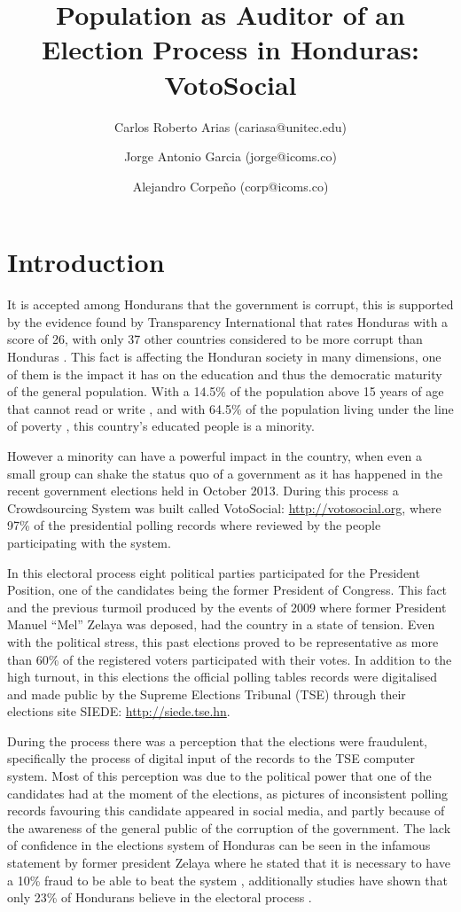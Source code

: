 \documentclass[letterpaper,10pt]{article}
\title{Population as Auditor of an Election Process in Honduras: VotoSocial}
\author[1,2]{Carlos Roberto Arias (cariasa@unitec.edu)}
\author[1,3]{Jorge Antonio Garcia (jorge@icoms.co)}
\author[3]{Alejandro Corpeño (corp@icoms.co)}
\affil[1]{Facultad de Ingenier\'{i}a, UNITEC, Tegucigalpa, Honduras}
\affil[2]{Instituto de Investigaci\'{o}n de Pol\'{i}ticas P\'{u}blicas, UNITEC, Tegucigalpa, Honduras}
\affil[3]{Icoms Technologies S de RL, Tegucigalpa, Honduras}
\begin{document}
\maketitle

\begin{abstract}

\end{abstract}

\section{Introduction}
It is accepted among Hondurans that the government is corrupt, this is supported by the evidence found by Transparency International that rates Honduras with a score of 26, with only 37 other countries considered to be more corrupt than Honduras \citep{transp}. This fact is affecting the Honduran society in many dimensions, one of them is the impact it has on the education and thus the democratic maturity of the general population. With a 14.5\% of the population above 15 years of age that cannot read or write \citep{bchrep}, and with 64.5\% of the population living under the line of poverty \citep{wbdata}, this country's educated people is a minority.


However a minority can have a powerful impact in the country, when even a small group can shake the status quo of a government \citep{saadia2014} as it has happened in the recent government elections held in October 2013. During this process a Crowdsourcing System was built called VotoSocial: \url{http://votosocial.org}, where 97\% of the presidential polling records where reviewed by the people participating with the system.

In this electoral process eight political parties participated for the President Position, one of the candidates being the former President of Congress. This fact and the previous turmoil produced by the events of 2009 where former President Manuel “Mel” Zelaya was deposed, had the country in a state of tension. Even with the political stress, this past elections proved to be representative as more than 60\% of the registered voters participated with their votes. In addition to the high turnout, in this elections the official polling tables records were digitalised and made public by the Supreme Elections Tribunal (TSE) through their elections site SIEDE: \url{http://siede.tse.hn}.

During the process there was a perception that the elections were fraudulent, specifically the process of digital input of the records to the TSE computer system. Most of this perception was due to the political power that one of the candidates had at the moment of the elections, as pictures of inconsistent polling records favouring this candidate appeared in social media, and partly because of the awareness of the general public of the corruption of the government. The lack of confidence in the elections system of Honduras can be seen in the infamous statement by former president Zelaya where he stated that it is necessary to have a 10\% fraud to be able to beat the system \citep{melvid}, additionally studies have shown that only 23\% of Hondurans believe in the electoral process \citep{romero2014}.
\end{document}
